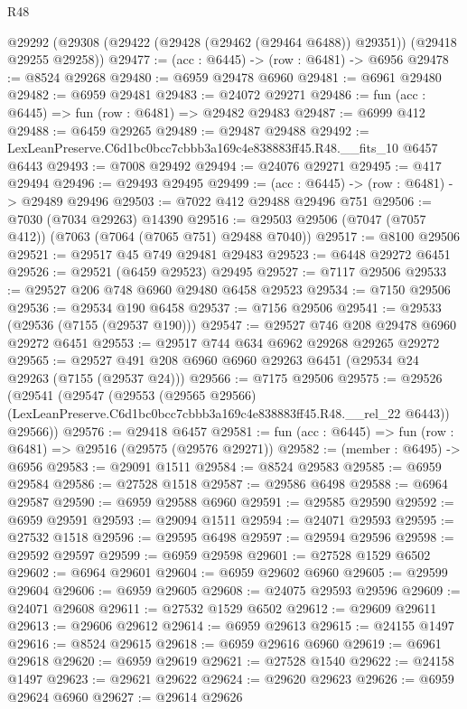 \begin{lexlean}{R48}
\begin{coremodule}
  @29292 (@29308 (@29422 (@29428 (@29462 (@29464 @6488)) @29351)) (@29418 @29255 @29258))
@29477 := (acc : @6445) -> (row : @6481) -> @6956
@29478 := @8524 @29268
@29480 := @6959 @29478 @6960
@29481 := @6961 @29480
@29482 := @6959 @29481
@29483 := @24072 @29271
@29486 := fun (acc : @6445) => fun (row : @6481) => @29482 @29483
@29487 := @6999 @412
@29488 := @6459 @29265
@29489 := @29487 @29488
@29492 := LexLeanPreserve.C6d1bc0bcc7cbbb3a169c4e838883ff45.R48.__fits_10 @6457 @6443
@29493 := @7008 @29492
@29494 := @24076 @29271
@29495 := @417 @29494
@29496 := @29493 @29495
@29499 := (acc : @6445) -> (row : @6481) -> @29489 @29496
@29503 := @7022 @412 @29488 @29496 @751
@29506 := @7030 (@7034 @29263) @14390
@29516 := @29503 @29506 (@7047 (@7057 @412)) (@7063 (@7064 (@7065 @751) @29488 @7040))
@29517 := @8100 @29506
@29521 := @29517 @45 @749 @29481 @29483
@29523 := @6448 @29272 @6451
@29526 := @29521 (@6459 @29523) @29495
@29527 := @7117 @29506
@29533 := @29527 @206 @748 @6960 @29480 @6458 @29523
@29534 := @7150 @29506
@29536 := @29534 @190 @6458
@29537 := @7156 @29506
@29541 := @29533 (@29536 (@7155 (@29537 @190)))
@29547 := @29527 @746 @208 @29478 @6960 @29272 @6451
@29553 := @29517 @744 @634 @6962 @29268 @29265 @29272
@29565 := @29527 @491 @208 @6960 @6960 @29263 @6451 (@29534 @24 @29263 (@7155 (@29537 @24)))
@29566 := @7175 @29506
@29575 := @29526
    (@29541
      (@29547
        (@29553
          (@29565 @29566)
          (LexLeanPreserve.C6d1bc0bcc7cbbb3a169c4e838883ff45.R48.__rel_22 @6443))
        @29566))
@29576 := @29418 @6457
@29581 := fun (acc : @6445) => fun (row : @6481) => @29516 (@29575 (@29576 @29271))
@29582 := (member : @6495) -> @6956
@29583 := @29091 @1511
@29584 := @8524 @29583
@29585 := @6959 @29584
@29586 := @27528 @1518
@29587 := @29586 @6498
@29588 := @6964 @29587
@29590 := @6959 @29588 @6960
@29591 := @29585 @29590
@29592 := @6959 @29591
@29593 := @29094 @1511
@29594 := @24071 @29593
@29595 := @27532 @1518
@29596 := @29595 @6498
@29597 := @29594 @29596
@29598 := @29592 @29597
@29599 := @6959 @29598
@29601 := @27528 @1529 @6502
@29602 := @6964 @29601
@29604 := @6959 @29602 @6960
@29605 := @29599 @29604
@29606 := @6959 @29605
@29608 := @24075 @29593 @29596
@29609 := @24071 @29608
@29611 := @27532 @1529 @6502
@29612 := @29609 @29611
@29613 := @29606 @29612
@29614 := @6959 @29613
@29615 := @24155 @1497
@29616 := @8524 @29615
@29618 := @6959 @29616 @6960
@29619 := @6961 @29618
@29620 := @6959 @29619
@29621 := @27528 @1540
@29622 := @24158 @1497
@29623 := @29621 @29622
@29624 := @29620 @29623
@29626 := @6959 @29624 @6960
@29627 := @29614 @29626

\end{coremodule}
\end{lexlean}
